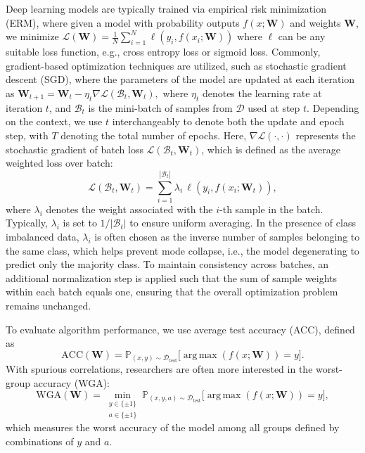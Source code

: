 \documentclass[letter,11pt]{article}
\DeclareMathOperator*{\argmax}{arg\,max}
\begin{document}
Deep learning models are typically trained via empirical risk minimization (ERM), where given a model with probability outputs $f(x; \mathbf{W})$ and weights $\mathbf{W}$, we minimize $\mathcal{L}(\mathbf{W}) = \frac{1}{N} \sum_{i=1}^{N} \ell(y_i,f(x_i;\mathbf{W}))$ where $\ell$ can be any suitable loss function, e.g., cross entropy loss or sigmoid loss. Commonly, gradient-based optimization techniques are utilized, such as stochastic gradient descent (SGD), where the parameters of the model are updated at each iteration as $ \mathbf{W}_{t+1} = \mathbf{W}_{t} - \eta_t \nabla \mathcal{L}(\mathcal{B}_t, \mathbf{W}_{t}),$
where $\eta_t$ denotes the learning rate at iteration $t$, and $\mathcal{B}_t$ is the mini-batch of samples from $\mathcal{D}$ used at step $t$. Depending on the context, we use $t$ interchangeably to denote both the update and epoch step, with $T$ denoting the total number of epochs. Here, $\nabla \mathcal{L}(\cdot, \cdot)$ represents the stochastic gradient of batch loss $\mathcal{L}(\mathcal{B}_t, \mathbf{W}_{t})$, which is defined as the average weighted loss over batch:
\begin{equation}\label{eq:mini_batch_loss}
    \mathcal{L}(\mathcal{B}_t, \mathbf{W}_{t}) =  \sum_{i=1}^{|\mathcal{B}_t|} \lambda_i \, \ell(y_i,f(x_i;\mathbf{W}_t)),
\end{equation}
where $\lambda_i$ denotes the weight associated with the $i$-th sample in the batch. Typically, $\lambda_i$ is set to $1/|\mathcal{B}_t|$ to ensure uniform averaging. In the presence of class imbalanced data, $\lambda_i$ is often chosen as the inverse number of samples belonging to the same class, which helps prevent mode collapse, i.e., the model degenerating to predict only the majority class. To maintain consistency across batches, an additional normalization step is applied such that the sum of sample weights within each batch equals one, ensuring that the overall optimization problem remains unchanged.

To evaluate algorithm performance, we use average test accuracy (ACC), defined as
\[
\mathrm{ACC}(\mathbf{W}) =\mathbb{P}_{(x, y) \sim \mathcal{D}_{\text{test}}} \big[\argmax(f(x;\mathbf{W}))=y\big].
\]
With spurious correlations, researchers are often more interested in the worst-group accuracy (WGA):
\[
\mathrm{WGA}(\mathbf{W})\!=\!
\min_{\substack{y \in \{\pm 1\} \\ a \in \{\pm 1\}}}
\mathbb{P}_{(x, y, a) \sim \mathcal{D}_{\text{test}}}
\big[\argmax(f(x;\mathbf{W}))\!=\!y\big],
\]
which measures the worst accuracy of the model among all groups defined by combinations of $y$ and $a$.
\end{document}
